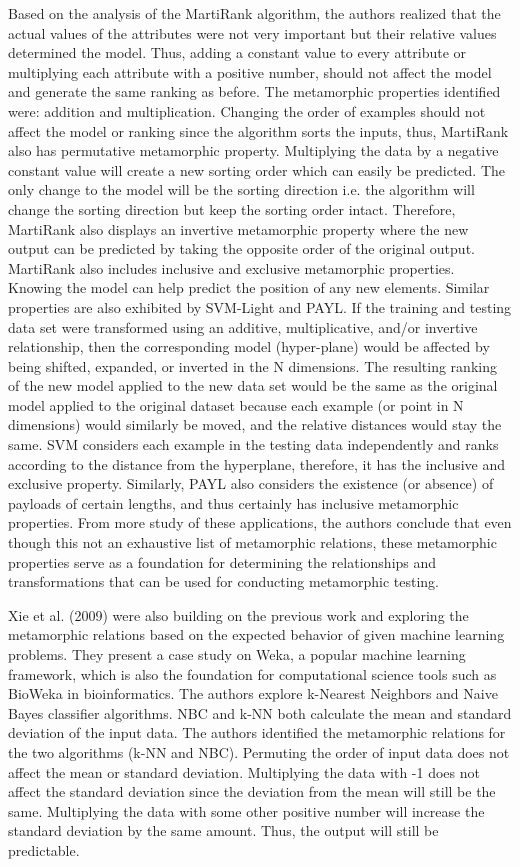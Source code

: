 Based on the analysis of the MartiRank algorithm, the authors realized that the actual values of the attributes were not very important but their relative values determined the model. Thus, adding a constant value to every attribute or multiplying each attribute with a positive number, should not affect the model and generate the same ranking as before. The metamorphic properties identified were: addition and multiplication.  Changing the order of examples should not affect the model or ranking since the algorithm sorts the inputs, thus, MartiRank also has permutative metamorphic property. Multiplying the data by a negative constant value will create a new sorting order which can easily be predicted. The only change to the model will be the sorting direction i.e. the algorithm will change the sorting direction but keep the sorting order intact. Therefore, MartiRank also displays an invertive metamorphic property where the new output can be predicted by taking the opposite order of the original output. MartiRank also includes inclusive and exclusive metamorphic properties. Knowing the model can help predict the position of any new elements. Similar properties are also exhibited by SVM-Light and PAYL. If the training and testing data set were transformed using an additive, multiplicative, and/or invertive relationship, then the corresponding model (hyper-plane) would be affected by being shifted, expanded, or inverted in the N dimensions. The resulting ranking of the new model applied to the new data set would be the same as the original model applied to the original dataset because each example (or point in N dimensions) would similarly be moved, and the relative distances would stay the same. SVM considers each example in the testing data independently and ranks according to the distance from the hyperplane, therefore, it has the inclusive and exclusive property. Similarly, PAYL also considers the existence (or absence) of payloads of certain lengths, and thus certainly has inclusive metamorphic properties. From more study of these applications, the authors conclude that even though this not an exhaustive list of metamorphic relations, these metamorphic properties serve as a foundation for determining the relationships and transformations that can be used for conducting metamorphic testing.


Xie et al. (2009) were also building on the previous work and exploring the metamorphic relations based on the expected behavior of given machine learning problems. They present a case study on Weka, a popular machine learning framework, which is also the foundation for computational science tools such as BioWeka in bioinformatics. The authors explore k-Nearest Neighbors and Naive Bayes classifier algorithms. NBC and k-NN both calculate the mean and standard deviation of the input data. The authors identified the metamorphic relations for the two algorithms (k-NN and NBC).
Permuting the order of input data does not affect the mean or standard deviation.
Multiplying the data with -1 does not affect the standard deviation since the deviation from the mean will still be the same.
Multiplying the data with some other positive number will increase the standard deviation by the same amount. Thus, the output will still be predictable.

